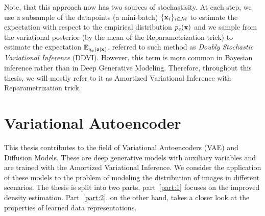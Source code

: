 Note, that this approach now has two sources of stochastisity. At each step, we use a subsample of the datapoints (a mini-batch) $\{{\mathbf{x}}_i\}_{i \in \mathcal{M}}$ to estimate the expectation with respect to the empirical distribution $p_{e}({\mathbf{x}})$ and we sample from the variational posterior (by the mean of the Reparametrization trick) to estimate the expectation $\mathbb{E}_{q_{\phi}({\mathbf{z}}|{\mathbf{x}})}$. \citet{titsias2014doubly} referred to such method as \textit{Doubly Stochastic Variational Inference} (DDVI). 
However, this term is more common in Bayesian inference rather than in Deep Generative Modeling. Therefore, throughout this thesis, we will mostly refer to it as Amortized Variational Inference with Reparametrization trick.


\section{Variational Autoencoder}\label{sec:into_deep_generative_models}


This thesis contributes to the field of Variational Autoencoders (VAE) and Diffusion Models. These are deep generative models with auxiliary variables and are trained with the Amortized Variational Inference. We consider the application of these models to the problem of modeling the distribution of images in different scenarios. The thesis is split into two parts, part~\ref{part:1} focuses on the improved density estimation. Part~\ref{part:2}. on the other hand, takes a closer look at the properties of learned data representations.







